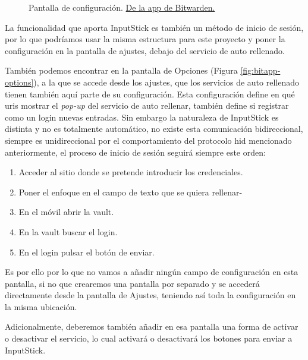 \begin{multicols}{2}[]
\begin{figure}[H]
        \caption{Pantalla de configuración. \href{https://play.google.com/store/apps/details?id=com.x8bit.bitwarden}{De la app de Bitwarden.}}
        \label{fig:bitapp-config}
    \end{figure}
    \columnbreak

     La funcionalidad que aporta InputStick es también un método de inicio de sesión, por lo que podríamos usar la misma estructura para este proyecto y poner la configuración en la pantalla de ajustes, debajo del servicio de auto rellenado.

    También podemos encontrar en la pantalla de Opciones (Figura \ref{fig:bitapp-options}), a la que se accede desde los ajustes, que los servicios de auto rellenado tienen también aquí parte de su configuración. Esta configuración define en qué \glspl{uri} mostrar el \textit{pop-up} del servicio de auto rellenar, también define si registrar como un \gls{login} nuevas entradas. Sin embargo la naturaleza de InputStick es distinta y no es totalmente automático, no existe esta comunicación bidireccional, siempre es unidireccional por el comportamiento del protocolo \gls{hid} mencionado anteriormente, el proceso de inicio de sesión seguirá siempre este orden:
    \begin{enumerate}
        \item Acceder al sitio donde se pretende introducir los credenciales.
        \item Poner el enfoque en el campo de texto que se quiera rellenar-
        \item En el móvil abrir la \gls{vault}.
        \item En la \gls{vault} buscar el \gls{login}.
        \item En el \gls{login} pulsar el botón de enviar.
    \end{enumerate}

    Es por ello por lo que no vamos a añadir ningún campo de configuración en esta pantalla, si no que crearemos una pantalla por separado y se accederá directamente desde la pantalla de Ajustes, teniendo así toda la configuración en la misma ubicación.

    Adicionalmente, deberemos también añadir en esa pantalla una forma de activar o desactivar el servicio, lo cual activará o desactivará los botones para enviar a InputStick.


\end{multicols}
